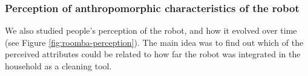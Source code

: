 \documentclass{frontiersSCNS} %
\begin{document}
%
%
%
%
%
%
%


\subsubsection{Perception of anthropomorphic characteristics of the robot\\}

We also studied people's perception of the robot, and how it evolved over time (see Figure \ref{fig:roomba-perception}). The main idea was to find out which of the perceived attributes could be related to how far the robot was integrated in the household as a cleaning tool.
\end{document}
